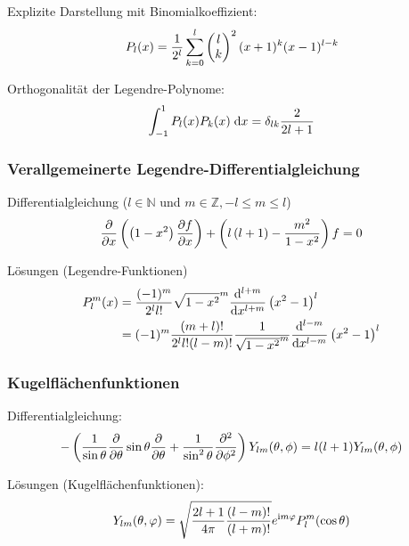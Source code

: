 			\noindent
			Explizite Darstellung mit Binomialkoeffizient:
			\begin{equation}
				P_l(x)=\frac{1}{2^l} \sum_{k=0}^{l}\left(\begin{matrix}l\\k\end{matrix}\right)^2(x+1)^k(x-1)^{l-k}
			\end{equation}

			\noindent
			Orthogonalität der Legendre-Polynome:
			\begin{equation}
				\int_{-1}^1 P_l(x) P_k(x)\;\mathrm{d} x = \delta_{lk} \frac{2}{2l+1}
			\end{equation}

		\subsubsection{Verallgemeinerte Legendre-Differentialgleichung}
			\noindent
			Differentialgleichung ($l\in\mathbb{N}$ und $m\in\mathbb{Z}, -l\le m\le l$)
			\begin{equation}
				\frac{\partial }{\partial x}\left(\left(1-x^2\right)\frac{\partial f}{\partial x}\right)+\left(l\left(l+1\right)-\frac{m^2}{1-x^2}\right)f= 0
			\end{equation}

			\noindent
			Lösungen (Legendre-Funktionen)
			\begin{equation}
				\begin{aligned}
					P_l^m(x) &= \frac{(-1)^m}{2^l l!}\sqrt{1-x^2}^m
					\frac{\mathrm{d}^{l+m}}{\mathrm{d} x^{l+m}}\left(x^2-1\right)^l \\
					&= (-1)^m \frac{(m+l)!}{2^l l! (l-m)!}\frac{1}{\sqrt{1-x^2}^m}
					\frac{\mathrm{d}^{l-m}}{\mathrm{d} x^{l-m}}\left(x^2-1\right)^l \\
				\end{aligned}
			\end{equation}

		\subsubsection{Kugelflächenfunktionen}
			\noindent
			Differentialgleichung:
			\begin{equation}
				-\left(
				\frac{1}{\sin\theta}\frac{\partial }{\partial \theta}\sin\theta\frac{\partial }{\partial \theta} + \frac{1}{\sin^2\theta}\frac{\partial^2}{\partial \phi^2}
				\right)
				Y_{lm}(\theta,\phi) = l(l+1)Y_{lm}(\theta,\phi)
			\end{equation}

			\noindent
			Lösungen (Kugelflächenfunktionen):
			\begin{equation} \label{eq:kugelflächenfunktionen}
				Y_{lm}(\theta,\varphi) = \sqrt{\frac{2l+1}{4\pi}\frac{(l-m)!}{(l+m)!}} e^{\mathrm{i} m\varphi} P_l^m(\cos\theta)
			\end{equation}

